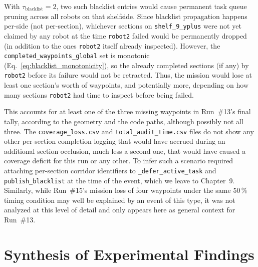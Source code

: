 With $\tau_{\text{blacklist}} = 2$, two such blacklist entries would cause permanent task queue pruning across all robots on that shelfside. Since blacklist propagation happens per-side (not per-section), whichever sections on \texttt{shelf\_9\_yplus} were not yet claimed by any robot at the time \texttt{robot2} failed would be permanently dropped (in addition to the ones \texttt{robot2} itself already inspected). However, the \texttt{completed\_waypoints\_global} set is monotonic (Eq.~\eqref{eq:blacklist_monotonicity}), so the already completed sections (if any) by \texttt{robot2} before its failure would not be retracted. Thus, the mission would lose at least one section's worth of waypoints, and potentially more, depending on how many sections \texttt{robot2} had time to inspect before being failed.

This accounts for at least one of the three missing waypoints in Run~\#13's final tally, according to the geometry and the code paths, although possibly not all three. The \texttt{coverage\_loss.csv} and \texttt{total\_audit\_time.csv} files do not show any other per-section completion logging that would have accrued during an additional section occlusion, much less a second one, that would have caused a coverage deficit for this run or any other. To infer such a scenario required attaching per-section corridor identifiers to \texttt{\_defer\_active\_task} and \texttt{publish\_blacklist} at the time of the event, which we leave to Chapter~9. Similarly, while Run~\#15's mission loss of four waypoints under the same $50\,\%$ timing condition may well be explained by an event of this type, it was not analyzed at this level of detail and only appears here as general context for Run~\#13.

\section{Synthesis of Experimental Findings}

